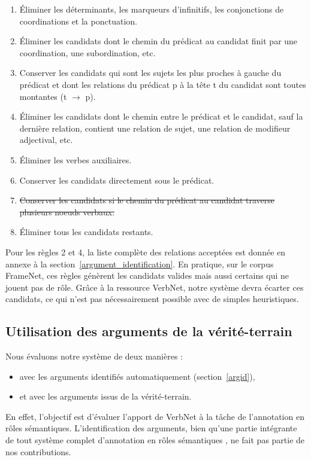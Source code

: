 \begin{enumerate}
    \item Éliminer les déterminants, les marqueurs d'infinitifs, les conjonctions de coordinations et la ponctuation.
    \item Éliminer les candidats dont le chemin du prédicat au candidat finit par une coordination, une subordination, etc.
    \item Conserver les candidats qui sont les sujets les plus proches à gauche du prédicat et dont les relations du prédicat p à la tête t du candidat sont toutes montantes (t $\rightarrow$ p).
    \item Éliminer les candidats  dont le chemin entre le prédicat et le candidat, sauf la dernière relation, contient une relation de sujet, une relation de modifieur adjectival, etc.
    \item Éliminer les verbes auxiliaires.
    \item Conserver les candidats directement sous le prédicat.
    \item \sout{Conserver les candidats si le chemin du prédicat au candidat traverse plusieurs noeuds verbaux.}
    \item Éliminer tous les candidats restants.
\end{enumerate}

Pour les règles 2 et 4, la liste complète des relations acceptées est donnée en
annexe à la section~\ref{argument_identification}. En pratique, sur le corpus
FrameNet, ces règles génèrent les candidats valides mais aussi certains qui ne
jouent pas de rôle. Grâce à la ressource VerbNet, notre système devra écarter
ces candidats, ce qui n'est pas nécessairement possible avec de simples
heuristiques.

\subsection{Utilisation des arguments de la vérité-terrain}

Nous évaluons notre système de deux manières :
\begin{itemize}
    \item avec les arguments identifiés automatiquement (section~\ref{argid}),
    \item et avec les arguments issus de la vérité-terrain.
\end{itemize}

En effet, l'objectif est d'évaluer l'apport de VerbNet à la tâche de
l'annotation en rôles sémantiques. L'identification des arguments, bien qu'une
partie intégrante de tout système complet d'annotation en rôles sémantiques
\citep{das2010probabilistic}, ne fait pas partie de nos contributions.


